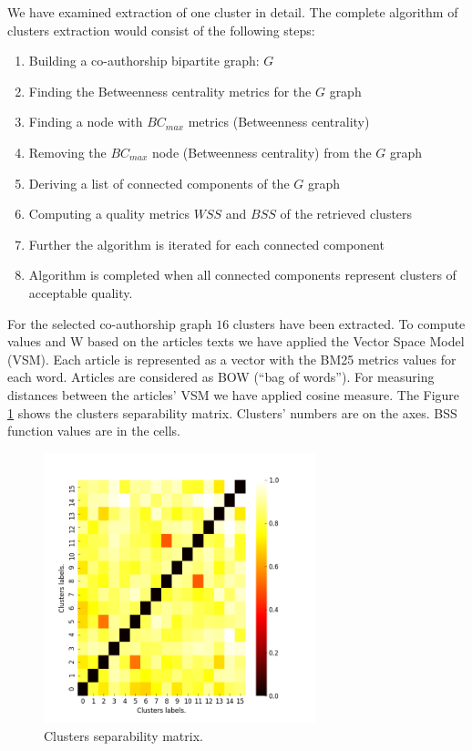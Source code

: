 \documentclass[12pt]{report}
\theoremstyle{definition}
\providecommand{\tightlist}{%
	\setlength{\itemsep}{0pt}\setlength{\parskip}{0pt}}
\begin{document}

We have examined extraction of one cluster in detail. The complete algorithm of clusters extraction would consist of the following steps:
\begin{enumerate}
	\tightlist
	\item Building a co-authorship bipartite graph: $\mathit{G}$
	\item Finding the Betweenness centrality metrics for the $\mathit{G}$ graph
	\item Finding a node with $BC_{max}$ metrics (Betweenness centrality)
	\item Removing the $BC_{max}$ node (Betweenness centrality) from the $\mathit{G}$ graph
	\item Deriving a list of connected components of the $\mathit{G}$ graph
	\item Computing a quality metrics $WSS$ and $BSS$ of the retrieved clusters
	\item Further the algorithm is iterated for each connected component
	\item Algorithm is completed when all connected components represent clusters of acceptable quality.
\end{enumerate}

For the selected co-authorship graph $16$ clusters have been extracted. 
To compute values and W based on the articles texts we have applied the Vector Space Model (VSM). Each article is represented as a vector with the BM25 \cite{lv2011adaptive} metrics values for each word. Articles are considered as BOW (``bag of words''). For measuring distances between the articles’ VSM we have applied cosine measure. The Figure \ref{fig:allo7} shows the clusters separability matrix. Clusters’ numbers are on the axes. BSS function values are in the cells.

\begin{figure}[ht]
	\centering
	\includegraphics[width=0.7\textwidth]{allo7eng.png}
	\caption{Clusters separability matrix.}
	\label{fig:allo7}
\end{figure}
\end{document}
